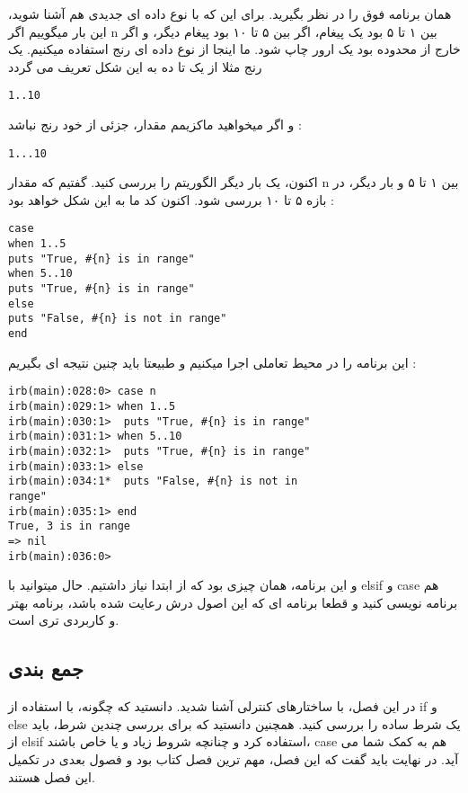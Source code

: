 \documentclass[11pt]{article}
\begin{document}
همان برنامه فوق را در نظر بگیرید. برای این که با نوع داده ای جدیدی هم آشنا شوید، این بار میگوییم اگر n بین ۱ تا ۵ بود یک پیغام، اگر بین ۵ تا ۱۰ بود پیغام دیگر، و اگر خارج از محدوده بود یک ارور چاپ شود. ما اینجا از نوع داده ای رنج استفاده میکنیم. یک رنج مثلا از یک تا ده به این شکل تعریف می گردد 
\begin{latin}
\begin{verbatim}
1..10
\end{verbatim}
\end{latin}
و اگر میخواهید ماکزیمم مقدار، جزئی از خود رنج نباشد :
\begin{latin}
\begin{verbatim}
1...10
\end{verbatim}
\end{latin}
اکنون، یک بار دیگر الگوریتم را بررسی کنید. گفتیم که مقدار n بین ۱ تا ۵ و بار دیگر، در بازه ۵ تا ۱۰ بررسی شود. اکنون کد ما به این شکل خواهد بود :
\begin{latin}
\begin{verbatim}
case 
when 1..5
puts "True, #{n} is in range"
when 5..10
puts "True, #{n} is in range"
else
puts "False, #{n} is not in range"
end
\end{verbatim}
\end{latin}
این برنامه را در محیط تعاملی اجرا میکنیم و طبیعتا باید چنین نتیجه ای بگیریم :
\begin{latin}
\begin{verbatim}
irb(main):028:0> case n
irb(main):029:1> when 1..5
irb(main):030:1>  puts "True, #{n} is in range"
irb(main):031:1> when 5..10
irb(main):032:1>  puts "True, #{n} is in range"
irb(main):033:1> else
irb(main):034:1*  puts "False, #{n} is not in 
range"
irb(main):035:1> end
True, 3 is in range
=> nil
irb(main):036:0>
\end{verbatim}
\end{latin}
و این برنامه، همان چیزی بود که از ابتدا نیاز داشتیم. حال میتوانید با elsif و case هم برنامه نویسی کنید و قطعا برنامه ای که این اصول درش رعایت شده باشد، برنامه بهتر و کاربردی تری است. 
\subsection{جمع بندی}
در این فصل، با ساختارهای کنترلی آشنا شدید. دانستید که چگونه، با استفاده از if و else یک شرط ساده را بررسی کنید. همچنین دانستید که برای بررسی چندین شرط، باید از elsif استفاده کرد و چنانچه شروط زیاد و یا خاص باشند، case هم به کمک شما می آید. در نهایت باید گفت که این فصل، مهم ترین فصل کتاب بود و فصول بعدی در تکمیل این فصل هستند. 
\end{document}
